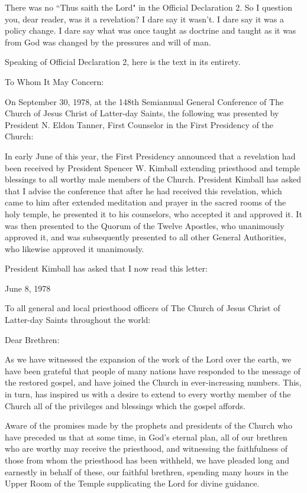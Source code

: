 \documentclass{article}
\begin{document}
There was no ``Thus saith the Lord" in the Official Declaration 2. So I question
you, dear reader, was it a revelation? I dare say it wasn't. I dare say it was
a policy change. I dare say what was once taught as doctrine and taught as it
was from God was changed by the pressures and will of man.

Speaking of Official Declaration 2, here is the text in its entirety.

\begin{displayquote}
To Whom It May Concern:

On September 30, 1978, at the 148th Semiannual General Conference of The 
Church of Jesus Christ of Latter-day Saints, the following was presented by 
President N. Eldon Tanner, First Counselor in the First Presidency of the 
Church:

In early June of this year, the First Presidency announced that a revelation 
had been received by President Spencer W. Kimball extending priesthood and 
temple blessings to all worthy male members of the Church. President Kimball 
has asked that I advise the conference that after he had received this 
revelation, which came to him after extended meditation and prayer in the 
sacred rooms of the holy temple, he presented it to his counselors, who 
accepted it and approved it. It was then presented to the Quorum of the 
Twelve Apostles, who unanimously approved it, and was subsequently presented 
to all other General Authorities, who likewise approved it unanimously.

President Kimball has asked that I now read this letter:

June 8, 1978

To all general and local priesthood officers of The Church of Jesus Christ 
of Latter-day Saints throughout the world:

Dear Brethren:

As we have witnessed the expansion of the work of the Lord over the earth, we 
have been grateful that people of many nations have responded to the message 
of the restored gospel, and have joined the Church in ever-increasing numbers. 
This, in turn, has inspired us with a desire to extend to every worthy member 
of the Church all of the privileges and blessings which the gospel affords.

Aware of the promises made by the prophets and presidents of the Church who have 
preceded us that at some time, in God’s eternal plan, all of our brethren who 
are worthy may receive the priesthood, and witnessing the faithfulness of those 
from whom the priesthood has been withheld, we have pleaded long and earnestly 
in behalf of these, our faithful brethren, spending many hours in the Upper Room 
of the Temple supplicating the Lord for divine guidance.


\end{displayquote}
\end{document}
